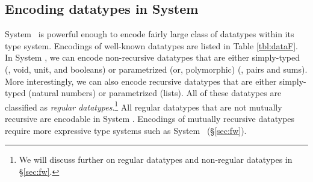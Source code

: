 \subsection{Encoding datatypes in System \F}
\label{sec:f:data}
System \F\ is  powerful enough to encode fairly large class of datatypes
within its type system. Encodings of well-known datatypes are listed in
Table \ref{tbl:dataF}. In System \F, we can encode non-recursive datatypes
that are either simply-typed (\eg, void, unit, and booleans)
or parametrized (or, polymorphic) (\eg, pairs and sums).
More interestingly, we can also encode recursive datatypes
that are either simply-typed (natural numbers) or parametrized (lists).
All of these datatypes are classified as \emph{regular datatypes}.\footnote{
	We will discuss further on regular datatypes
	and non-regular datatypes in \S\ref{sec:fw}. }
All regular datatypes that are not mutually recursive are encodable
in System \F. Encodings of mutually recursive datatypes require
more expressive type systems such as System \Fw\ (\S\ref{sec:fw}).

